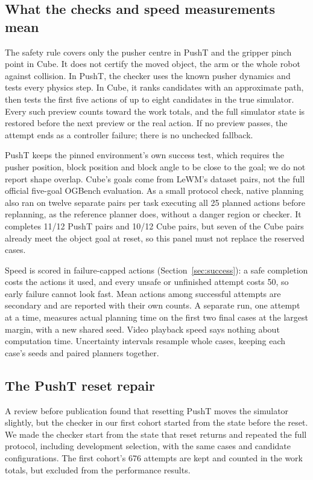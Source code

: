 \subsection{What the checks and speed measurements mean}
The safety rule covers only the pusher centre in PushT and the gripper pinch
point in Cube. It does not certify the moved object, the arm or the whole
robot against collision. In PushT, the checker uses the known pusher
dynamics and tests every physics step. In Cube, it ranks candidates with an
approximate path, then tests the first five actions of up to eight
candidates in the true simulator. Every such preview counts toward the work
totals, and the full simulator state is restored before the next preview or
the real action. If no preview passes, the attempt ends as a controller
failure; there is no unchecked fallback.

PushT keeps the pinned environment's own success test, which requires the
pusher position, block position and block angle to be close to the goal; we
do not report shape overlap. Cube's goals come from LeWM's dataset pairs, not
the full official five-goal OGBench evaluation. As a small protocol check,
native planning also ran on twelve separate pairs per task executing all
25 planned actions before replanning, as the reference planner does, without
a danger region or checker. It completes 11/12 PushT pairs and 10/12 Cube
pairs, but seven of the Cube pairs already meet the object goal at reset, so
this panel must not replace the reserved cases.

Speed is scored in failure-capped actions (Section~\ref{sec:success}): a safe
completion costs the actions it used, and every unsafe or unfinished attempt
costs 50, so early failure cannot look fast. Mean actions among successful
attempts are secondary and are reported with their own counts. A separate
run, one attempt at a time, measures actual planning time on the first two
final cases at the largest margin, with a new shared seed. Video playback
speed says nothing about computation time. Uncertainty intervals resample
whole cases, keeping each case's seeds and paired planners together.

\subsection{The PushT reset repair}
A review before publication found that resetting PushT moves the simulator
slightly, but the checker in our first cohort started from the state before
the reset. We made the checker start from the state that reset returns and
repeated the full protocol, including development selection, with the same
cases and candidate configurations. The first cohort's 676 attempts are kept
and counted in the work totals, but excluded from the performance results.
